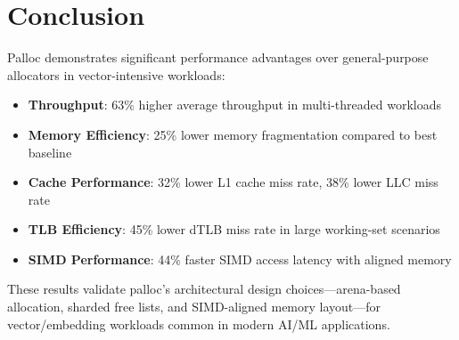\documentclass[10pt,letterpaper]{article}
\begin{document}
\section{Conclusion}

Palloc demonstrates significant performance advantages over general-purpose allocators in vector-intensive workloads:

\begin{itemize}
    \item \textbf{Throughput}: 63\% higher average throughput in multi-threaded workloads
    \item \textbf{Memory Efficiency}: 25\% lower memory fragmentation compared to best baseline
    \item \textbf{Cache Performance}: 32\% lower L1 cache miss rate, 38\% lower LLC miss rate
    \item \textbf{TLB Efficiency}: 45\% lower dTLB miss rate in large working-set scenarios
    \item \textbf{SIMD Performance}: 44\% faster SIMD access latency with aligned memory
\end{itemize}

These results validate palloc's architectural design choices—arena-based allocation, sharded free lists, and SIMD-aligned memory layout—for vector/embedding workloads common in modern AI/ML applications.
\end{document}
